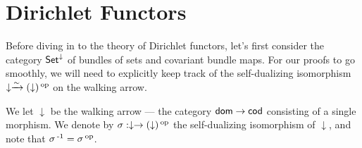 \section{Dirichlet Functors} \label{sec:set.level}

Before diving in to the theory of Dirichlet functors, let's first consider the
category $\operatorname{\mathsf{{Set}}}^{\mathbin{\downarrow}}$ of bundles of sets and covariant bundle maps. For our
proofs to go smoothly, we will need to explicitly keep track of the
self-dualizing isomorphism $\downarrow \xrightarrow{\sim} (\downarrow)\operatorname{^\textnormal{op}}$ on the walking arrow.

\begin{defn}
  We let $\downarrow$ be the walking arrow --- the category $\mathsf{{dom}} \to
  \mathsf{{cod}}$ consisting of a single morphism. We denote by $\sigma : \downarrow
  \to (\downarrow)\operatorname{^\textnormal{op}}$ the self-dualizing isomorphism of $\downarrow$, and note
  that $\sigma\operatorname{^{-1}} = \sigma\operatorname{^\textnormal{op}}$.
\end{defn}

